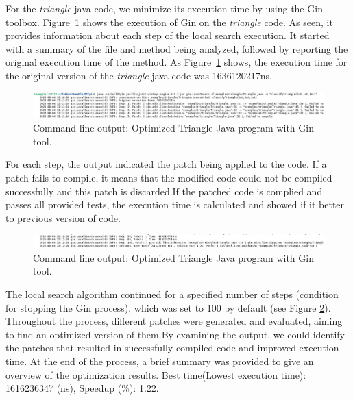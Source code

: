 For the \textit{triangle} java code, we minimize its execution time by using the Gin toolbox. Figure~\ref{fig:Optimised program file of Triangle 1} shows the execution of Gin on the \textit{triangle} code. As seen, it provides information about each step of the local search execution. It started with a summary of the file and method being analyzed, followed by reporting the original execution time of the method. As Figure~\ref{fig:Optimised program file of Triangle 1} shows, the execution time for the original version of the \textit{triangle} java code was 1636120217ns.

\begin{figure}[ht!]
  \centering
  \includegraphics[width=1\textwidth]{img/Triangle_Experiment_output_1.png}
  \caption{Command line output: Optimized Triangle Java program with Gin tool.}
  \label{fig:Optimised program file of Triangle 1}
\end{figure}

\vspace{.5em}
For each step, the output indicated the patch being applied to the code. If a patch fails to compile, it means that the modified code could not be compiled successfully and this patch is discarded.If the patched code is complied and passes all provided tests, the execution time is calculated and showed if it better to previous version of code.

\begin{figure}[ht!]
  \centering
  \includegraphics[width=1\textwidth]{img/Triangle_Experiment_output_2.png}
  \caption{Command line output: Optimized Triangle Java program with Gin tool.}
  \label{fig:Optimised program file of Triangle 2}
\end{figure}

\vspace{.5em}
The local search algorithm continued for a specified number of steps (condition for stopping  the Gin process), which was set to 100 by default (see Figure \ref{fig:Optimised program file of Triangle 2}). Throughout the process, different patches were generated and evaluated, aiming to find an optimized version of them.By examining the output, we could identify the patches that resulted in successfully compiled code and improved execution time. At the end of the process, a brief summary was provided to give an overview of the optimization results. Best time(Lowest execution time): 1616236347 (ns), Speedup (\%): 1.22.


